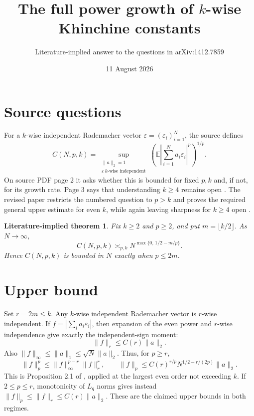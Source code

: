 \documentclass[11pt]{article}
\title{The full power growth of $k$-wise Khinchine constants}
\author{Literature-implied answer to the questions in arXiv:1412.7859}
\date{11 August 2026}
\newtheorem*{theorem}{Literature-implied theorem}
\newcommand{\E}{\mathbb E}
\begin{document}
\maketitle

\begin{center}
\end{center}

\section*{Source questions}
For a $k$-wise independent Rademacher vector $\varepsilon=(\varepsilon_i)_{i=1}^N$, the source defines
\[
C(N,p,k)=\sup_{\substack{\|a\|_2=1\\ \varepsilon\ k\text{-wise independent}}}
 \left(\E\left|\sum_{i=1}^N a_i\varepsilon_i\right|^p\right)^{1/p}.
\]
On source PDF page 2 it asks whether this is bounded for fixed $p,k$ and, if not, for its growth rate.  Page 3 says that understanding $k\ge4$ remains open \cite{PSsource}.  The revised paper restricts the numbered question to $p>k$ and proves the required general upper estimate for even $k$, while again leaving sharpness for $k\ge4$ open \cite{PSrevised}.

\begin{theorem}
Fix $k\ge2$ and $p\ge2$, and put $m=\lfloor k/2\rfloor$.  As $N\to\infty$,
\[
C(N,p,k)\asymp_{p,k}N^{\max\{0,\,1/2-m/p\}}.
\]
Hence $C(N,p,k)$ is bounded in $N$ exactly when $p\le2m$.
\end{theorem}

\section*{Upper bound}
Set $r=2m\le k$.  Any $k$-wise independent Rademacher vector is $r$-wise independent.  If
$f=|\sum_i a_i\varepsilon_i|$, then expansion of the even power and $r$-wise independence give exactly the independent-sign moment:
\[
 \|f\|_r\le C(r)\|a\|_2.
\]
Also $\|f\|_\infty\le\|a\|_1\le\sqrt N\|a\|_2$.  Thus, for $p\ge r$,
\[
 \|f\|_p^p\le \|f\|_\infty^{p-r}\|f\|_r^r,
 \qquad
 \|f\|_p\le C(r)^{r/p}N^{1/2-r/(2p)}\|a\|_2.
\]
This is Proposition 2.1 of \cite{PSrevised}, applied at the largest even order not exceeding $k$.  If $2\le p\le r$, monotonicity of $L_q$ norms gives instead $\|f\|_p\le\|f\|_r\le C(r)\|a\|_2$.  These are the claimed upper bounds in both regimes.
\end{document}
